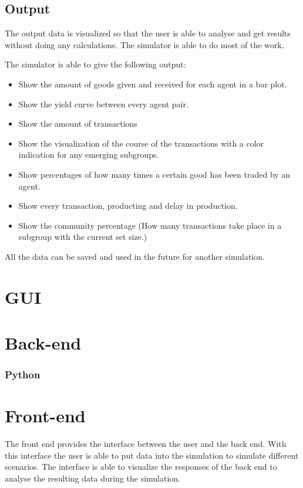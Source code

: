 \documentclass[twoside,openright]{uva-bachelor-thesis}
\begin{document}
\subsection{Output}
The output data is visualized so that the user is able to analyse and get results without doing any calculations. The simulator is able to do most of the work.

The simulator is able to give the following output:
\begin{itemize}
  \item Show the amount of goods given and received for each agent in a bar plot.
  \item Show the yield curve between every agent pair.
  \item Show the amount of transactions
  \item Show the visualization of the course of the transactions with a color indication for any emerging subgroups.
  \item Show percentages of how many times a certain good has been traded by an agent.
  \item Show every transaction, producting and delay in production.
  \item Show the community percentage (How many transactions take place in a subgroup with the current set size.)
\end{itemize}

All the data can be saved and used in the future for another simulation.

\section{GUI}

\section{Back-end}

\subsubsection{Python}

\section{Front-end}
The front end provides the interface between the user and the back end. With this interface the user is able to put data into the simulation to simulate different scenarios. The interface is able to visualize the responses of the back end to analyse the resulting data during the simulation.
\end{document}
